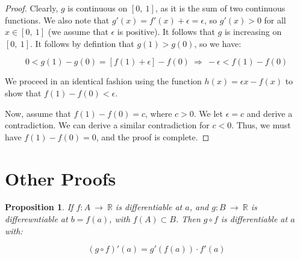 \documentclass[10pt, oneside]{amsart}
\newtheorem{prop}{Proposition}
\begin{document}
    \begin{proof}
      Clearly, $g$ is continuous on $[0, \ 1]$, as it is the sum of two continuous functions. We also note that $g'(x) = f'(x) + \epsilon = \epsilon$,
      so $g'(x) > 0$ for all $x \in [0, \ 1]$ (we assume that $\epsilon$ is positive). It follows that $g$ is increasing on $[0, \ 1]$. It follows by
      defintion that $g(1) > g(0)$, so we have:

      $$0 < g(1) - g(0) = [f(1) + \epsilon] - f(0) \ \Rightarrow \ -\epsilon < f(1) - f(0)$$

      We proceed in an identical fashion using the function $h(x) = \epsilon x - f(x)$ to show that $f(1) - f(0) < \epsilon$.
      \newline

      Now, assume that $f(1) - f(0) = c$, where $c > 0$. We let $\epsilon = c$ and derive a contradiction. We can derive a similar contradiction
      for $c < 0$. Thus, we must have $f(1) - f(0) = 0$, and the proof is complete.
      \end{proof}

    \section{Other Proofs}

    \begin{prop}
      If $f : A \ \rightarrow \ \mathbb{R}$ is differentiable at $a$, and $g : B \ \rightarrow \ \mathbb{R}$ is differewntiable at $b = f(a)$, with $f(A) \subset B$. Then
      $g \circ f$ is differentiable at $a$ with:

      $$(g \circ f)'(a) = g'(f(a)) \cdot f'(a)$$
    \end{prop}
\end{document}
